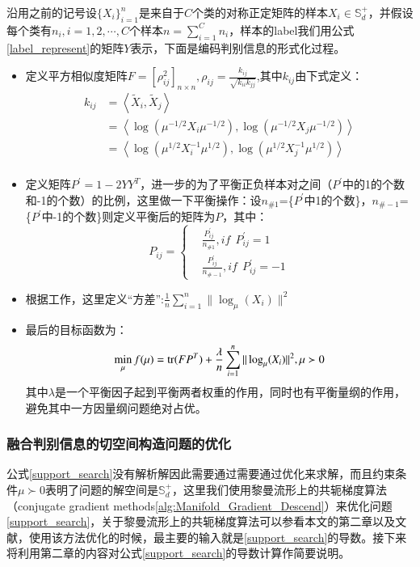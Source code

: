 沿用之前的记号设$\{X_i\}_{i=1}^{n}$是来自于$C$个类的对称正定矩阵的样本$X_i \in \mathbb{S}_{d}^{+}$，并假设每个类有$n_i,i=1,2,\cdots,C$个样本$n=\sum_{i=1}^{C}n_i$，样本的label我们用公式\ref{label_represent}的矩阵$Y$表示，下面是编码判别信息的形式化过程。
\begin{itemize}
\item 定义平方相似度矩阵$F=[\rho_{ij}^{2}]_{n\times n},\rho_{ij}=\frac{k_{ij}}{\sqrt{k_{ii}k_{jj}}}$,其中$k_{ij}$由下式定义：
\begin{equation}
\begin{split}
k_{ij}&=\left<\tilde{X}_i,\tilde{X}_j\right>\\
&=\left<\log(\mu^{-1/2}X_i\mu^{-1/2}),\log(\mu^{-1/2}X_j\mu^{-1/2})\right>\\
&=\left<\log(\mu^{1/2}X_{i}^{-1}\mu^{1/2}),\log(\mu^{1/2}X_{j}^{-1}\mu^{1/2})\right>\\
\end{split}
\end{equation}
\item 定义矩阵$P^{\prime}=1-2YY^{T}$，进一步的为了平衡正负样本对之间（$P^{\prime}$中的1的个数和-1的个数）的比例，这里做一下平衡操作：设$n_{\#1}$=\{$P^{\prime}$中1的个数\}，$n_{\#-1}$=\{$P^{\prime}$中-1的个数\}则定义平衡后的矩阵为$P$，其中：
\begin{equation}
P_{ij}=\left\{
\begin{split}
&\frac{P_{ij}^{\prime}}{n_{\#1}},if~~P_{ij}^{\prime}=1\\
&\frac{P_{ij}^{\prime}}{n_{\#-1}},if~~P_{ij}^{\prime}=-1
\end{split}
\right.
\end{equation}
\item 根据工作\cite{PGA}，这里定义“方差”:$\frac{1}{n}\sum_{i=1}^{n} \|\log_{\mu}(X_i)\|^2$
\item 最后的目标函数为：
\begin{equation}
\label{support_search}
\min_{\mu}f(\mu)={\rm tr}(FP^{T})+\frac{\lambda}{n}\sum_{i=1}^{n} \|\log_{\mu}(X_i)\|^2,\mu \succ 0
\end{equation}
其中$\lambda$是一个平衡因子起到平衡两者权重的作用，同时也有平衡量纲的作用，避免其中一方因量纲问题绝对占优。
\end{itemize}
\subsubsection{融合判别信息的切空间构造问题的优化}
\label{sec:discrim_single_support_opt}
公式\ref{support_search}没有解析解因此需要通过需要通过优化来求解，而且约束条件$\mu \succ 0$表明了问题的解空间是$\mathbb{S}_{d}^{+}$，这里我们使用黎曼流形上的共轭梯度算法（conjugate gradient methods\ref{alg:Manifold_Gradient_Descend}）来优化问题\ref{support_search}，关于黎曼流形上的共轭梯度算法可以参看本文的第二章以及文献\cite{Conjugate_Gradient_Survery}，使用该方法优化的时候，最主要的输入就是\ref{support_search}的导数。接下来将利用第二章的内容对公式\ref{support_search}的导数计算作简要说明。

